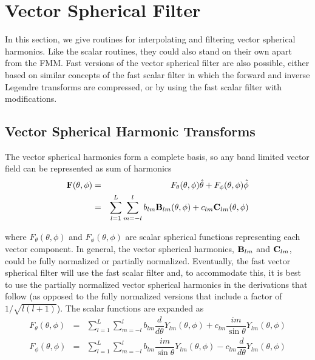 %

\clearpage
\section{Vector Spherical Filter}
\label{sec:vecsphfilter}


In this section, we give routines for interpolating and filtering vector spherical harmonics. Like the scalar routines, they could also stand on their own apart from the FMM. Fast versions of the vector spherical filter are also possible, either based on similar concepts of the fast scalar filter in which the forward and inverse Legendre transforms are compressed, or by using the fast scalar filter with modifications.
 
\subsection{Vector Spherical Harmonic Transforms}

The vector spherical harmonics form a complete basis, so any band limited vector field can be represented as sum of harmonics
\begin{eqnarray}
\mathbf{F}(\theta,\phi) &=& F_{\theta}(\theta,\phi) \hat\theta + F_{\phi}(\theta,\phi) \hat\phi \\
\ & = & \sum_{l=1}^{L} \sum_{m = -l}^{l} b_{lm} \mathbf{B}_{lm}(\theta,\phi) + c_{lm} \mathbf{C}_{lm}(\theta,\phi)
\end{eqnarray}

\noindent where $F_{\theta}(\theta,\phi)$ and $F_{\phi}(\theta,\phi)$ are scalar spherical functions representing each vector component. In general, the vector spherical harmonics, $\mathbf{B}_{lm}$ and $\mathbf{C}_{lm}$, could be fully normalized or partially normalized. Eventually, the fast vector spherical filter will use the fast scalar filter and, to accommodate this, it is best to use the partially normalized vector spherical harmonics in the derivations that follow (as opposed to the fully normalized versions that include a factor of $1/\sqrt{l(l+1)}$). The scalar functions are expanded as
\begin{eqnarray}
 F_{\theta}(\theta,\phi) &=&  \sum_{l=1}^{L} \sum_{m = -l}^{l} b_{lm}  \dfrac{d}{d\theta} Y_{lm}(\theta,\phi)   + c_{lm} \dfrac{im}{\sin\theta} Y_{lm}(\theta,\phi) \label{fmmFtheta} \\
F_{\phi}(\theta,\phi) &=&\sum_{l=1}^{L} \sum_{m = -l}^{l} b_{lm} \dfrac{im}{\sin\theta} Y_{lm}(\theta,\phi) -c_{lm} \dfrac{d}{d\theta} Y_{lm}(\theta,\phi)    \label{fmmFphi}
\end{eqnarray}

